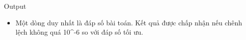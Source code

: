 Output
\begin{itemize}
	\item     Một dòng duy nhất là đáp số bài toán. Kết quả được chấp nhận nếu chênh lệch không quá 10^-6 so với đáp số tối ưu.   
\end{itemize}
